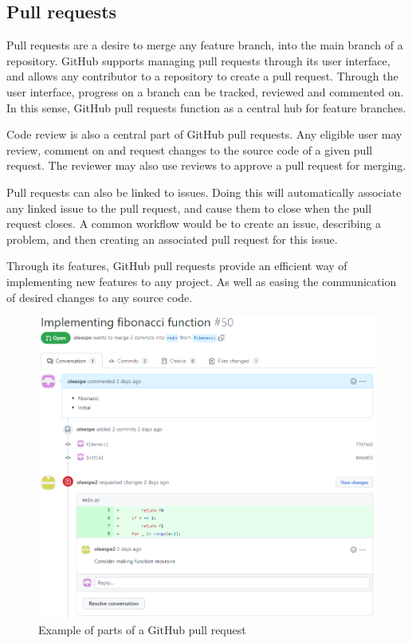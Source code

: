 \subsection{Pull requests}

Pull requests are a desire to merge any feature branch, into the main branch of a repository.
GitHub supports managing pull requests through its user interface, and allows any contributor to a repository to create a pull request.
Through the user interface, progress on a branch can be tracked, reviewed and commented on.
In this sense, GitHub pull requests function as a central hub for feature branches.

Code review is also a central part of GitHub pull requests.
Any eligible user may review, comment on and request changes to the source code of a given pull request.
The reviewer may also use reviews to approve a pull request for merging.

Pull requests can also be linked to issues.
Doing this will automatically associate any linked issue to the pull request, and cause them to close when the pull request closes.
A common workflow would be to create an issue, describing a problem, and then creating an associated pull request for this issue.

Through its features, GitHub pull requests provide an efficient way of implementing new features to any project.
As well as easing the communication of desired changes to any source code.

\begin{figure}[ht]
    \centering
    \includegraphics[width=\textwidth]{photos/pull-request.PNG}
    \caption{Example of parts of a GitHub pull request}
    \label{fig:pull-request}
\end{figure}

